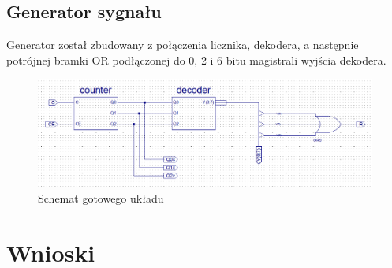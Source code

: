 \documentclass[wide,a4paper,titlepage,12pt] {article}
\begin{document}
  \subsection{Generator sygnału}
  Generator został zbudowany z połączenia licznika, dekodera, a następnie potrójnej bramki OR podłączonej do 0, 2 i 6 bitu magistrali wyjścia dekodera.

  \begin{figure}[htbp]
    \begin{center}
      \includegraphics[scale=0.4]{uklad.png}
      \caption{Schemat gotowego układu}
    \end{center}
  \end{figure}



  \section{Wnioski}
\end{document}
